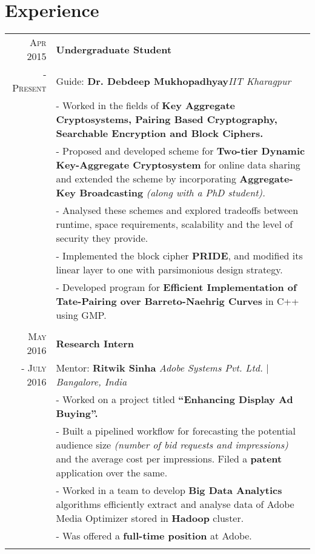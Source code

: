 \section{Experience}

\begin{tabular}{r|p{16.3cm}}

\textsc{Apr 2015} & \textbf{Undergraduate Student}\hfill\textbf{\lowercase{\href{http://cse.iitkgp.ac.in/resgrp/seal/}}
{Secure Embedded Architecture Laboratory (SEAL)}}\\
\textsc{- Present}& \scriptsize{Guide: \textbf{Dr. Debdeep Mukhopadhyay}}\hfill\textit{IIT Kharagpur}\\
& \footnotesize{- Worked in the fields of \textbf{Key Aggregate Cryptosystems, Pairing Based Cryptography, Searchable Encryption and Block Ciphers.}}\\
& \footnotesize{- Proposed and developed scheme for \textbf{Two-tier Dynamic Key-Aggregate Cryptosystem} for online data sharing and extended the scheme by incorporating \textbf{Aggregate-Key Broadcasting} \textit{(along with a PhD student).}}\\
& \footnotesize{- Analysed these schemes and explored tradeoffs between runtime, space requirements, scalability and the level of security they provide.}\\
& \footnotesize{- Implemented the block cipher \textbf{PRIDE}, and modified its linear layer to one with parsimonious design strategy.}\\
& \footnotesize{- Developed program for \textbf{Efficient Implementation of Tate-Pairing over Barreto-Naehrig Curves} in C++ using GMP.}\\
\multicolumn{2}{c}{} \\

\textsc{May 2016} & \textbf{Research Intern}\hfill\textbf{\lowercase{\href{https://research.adobe.com/about-the-labs/bigdata-experience-lab}}{Big Data Experience Lab (BEL)}}\\
\textsc{- July 2016}& \scriptsize{Mentor: \textbf{Ritwik Sinha}}\hfill{\textit{ Adobe Systems Pvt. Ltd.} | \textit{Bangalore, India}}\\
& \footnotesize{- Worked on a project titled \textbf{“Enhancing Display Ad Buying”.}}\\
& \footnotesize{- Built a pipelined workflow for forecasting the potential audience size \textit{(number of bid requests and impressions)} and the average cost per impressions. Filed a \textbf{patent} application over the same.}\\
& \footnotesize{- Worked in a team to develop \textbf{Big Data Analytics} algorithms efficiently extract and analyse data of Adobe Media Optimizer stored in \textbf{Hadoop} cluster.}\\
& \footnotesize{- Was offered a \textbf{full-time position} at Adobe.}\\
\multicolumn{2}{c}{} \\


\end{tabular}
